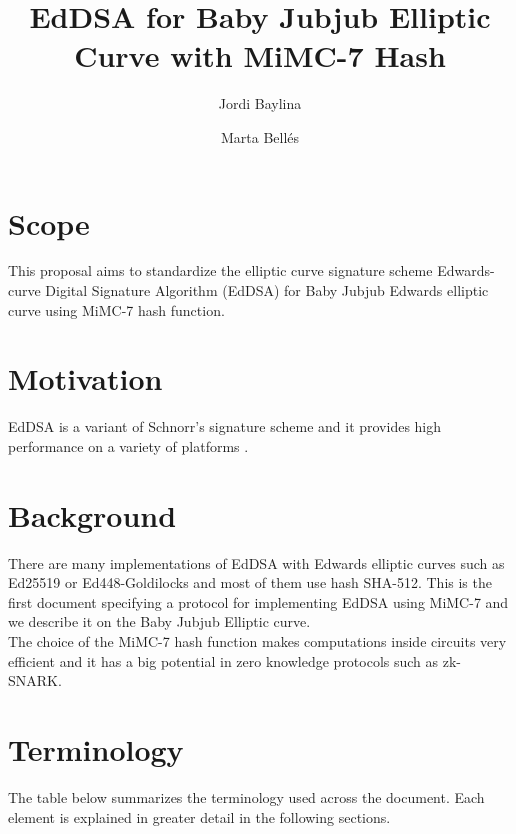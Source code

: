 \documentclass{article}
\title{ EdDSA for Baby Jubjub Elliptic Curve with MiMC-7 Hash \vspace{-0.2cm} }
\author[1]{Jordi Baylina}
\author[1,2]{Marta Bellés}
\affil[1]{iden3}
\affil[2]{Universitat Pompeu Fabra}
\date{}
\begin{document}
\begin{spacing}{1.2}
\maketitle 
\vspace{1cm}
\tableofcontents
		
\vspace{0.5cm}
		
\newpage
		
\section{Scope}

This proposal aims to standardize the elliptic curve signature scheme Edwards-curve Digital Signature Algorithm (EdDSA) for Baby Jubjub Edwards elliptic curve using MiMC-7 hash function.
		
\section{Motivation}

EdDSA is a variant of Schnorr's signature scheme and it provides high performance on a variety of platforms \cite{eddsa}. 
		
\section{Background}

There are many implementations of EdDSA with Edwards elliptic curves such as Ed25519 or Ed448-Goldilocks and most of them use hash SHA-512. This is the first document specifying a protocol for implementing EdDSA using MiMC-7 and we describe it on the Baby Jubjub Elliptic curve.  \\
		
The choice of the MiMC-7 hash function makes computations inside circuits very efficient and it has a big potential in zero knowledge protocols such as zk-SNARK.

\section{Terminology}

The table below summarizes the terminology used across the document. Each element is explained in greater detail in the following sections.


\end{spacing}
\end{document}
